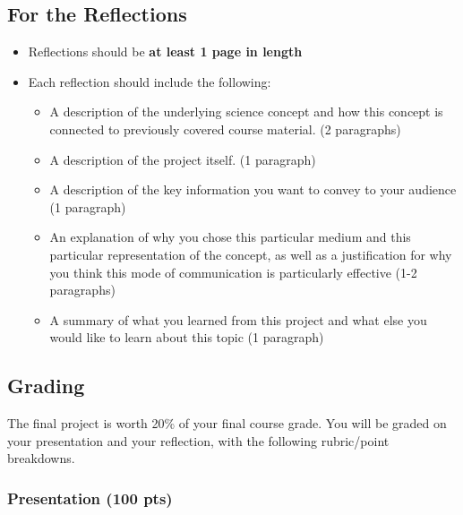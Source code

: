 \documentclass[12pt]{article}
\begin{document}
\subsection*{For the Reflections}
\begin{itemize}[noitemsep]
    \item Reflections should be \textbf{at least 1 page in length}
    \item Each reflection should include the following:
    \begin{itemize}
        \item A description of the underlying science concept and how this concept is connected to previously covered course material. (2 paragraphs)
        \item A description of the project itself. (1 paragraph)
        \item A description of the key information you want to convey to your audience (1 paragraph)
        \item An explanation of why you chose this particular medium and this particular representation of the concept, as well as a justification for why you think this mode of communication is particularly effective (1-2 paragraphs)
        \item A summary of what you learned from this project and what else you would like to learn about this topic (1 paragraph)

    \end{itemize}
\end{itemize}

\subsection*{Grading}
The final project is worth 20\% of your final course grade. You will be graded on your presentation and your reflection, with the following rubric/point breakdowns.

\subsubsection*{Presentation (100 pts)}
\end{document}
